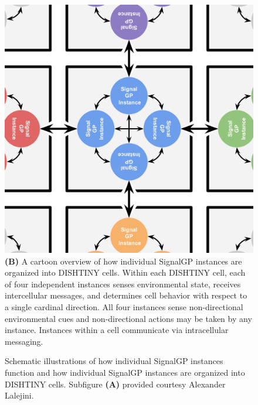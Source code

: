 \begin{figure}
\begin{center}
\begin{minipage}[t]{0.5\linewidth}
\includegraphics[width=0.8\linewidth]{img/dishtinygp-cartoon}\\
{\textbf{(B)}
A cartoon overview of how individual SignalGP instances are organized into DISHTINY cells.
Within each DISHTINY cell, each of four independent instances senses environmental state, receives intercellular messages, and determines cell behavior with respect to a single cardinal direction.
All four instances sense non-directional environmental cues and non-directional actions may be taken by any instance.
Instances within a cell communicate via intracellular messaging.
}
\end{minipage}

\caption{
Schematic illustrations of how individual SignalGP instances function and how individual SignalGP instances are organized into DISHTINY cells.
Subfigure \textbf{(A)} provided courtesy Alexander Lalejini.
}
\label{fig:signalgp-dishtinygp}
\end{center}
\end{figure}
